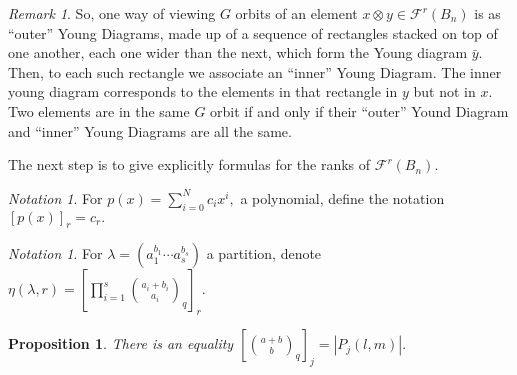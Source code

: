 \documentclass{amsart}
\newtheorem{prop}[thm]{Proposition}
\theoremstyle{remark}
\newtheorem{rem}[thm]{Remark}
\newtheorem{note}[thm]{Notation}
\begin{document}
\begin{rem}
So, one way of viewing $G$ orbits of an element $x \otimes y \in \mathcal F^r(B_n)$ is as ``outer'' Young Diagrams, made up of a sequence of rectangles stacked on top of one another, each one wider than the next, which form the Young diagram $\bar y.$ Then, to each such rectangle we associate an ``inner'' Young Diagram. The inner young diagram corresponds to the elements in that rectangle in $y$ but not in $x.$ Two elements are in the same $G$ orbit if and only if their ``outer'' Yound Diagram and ``inner'' Young Diagrams are all the same.
\end{rem}

The next step is to give explicitly formulas for the ranks of $\mathcal F^r(B_n).$

\begin{note}
For $p(x) = \sum_{i=0}^N c_ix^i,$ a polynomial, define the notation $[p(x)]_r = c_r.$
\end{note}

\begin{note}
For $\lambda = (a_1^{b_1} \cdots a_s^{b_s})$ a partition, denote $\eta(\lambda,r) = \left[\prod_{i=1}^s \binom{a_i+b_i}{a_i}_q\right]_r.$
\end{note}

\begin{prop}
\cite[Proposition 1.3.19]{enumerative_comb}
\label{prop:counting_box_partitions}
There is an equality $[\binom {a+b} b_q]_j = |P_j(l,m)|.$
\end{prop}
\end{document}
